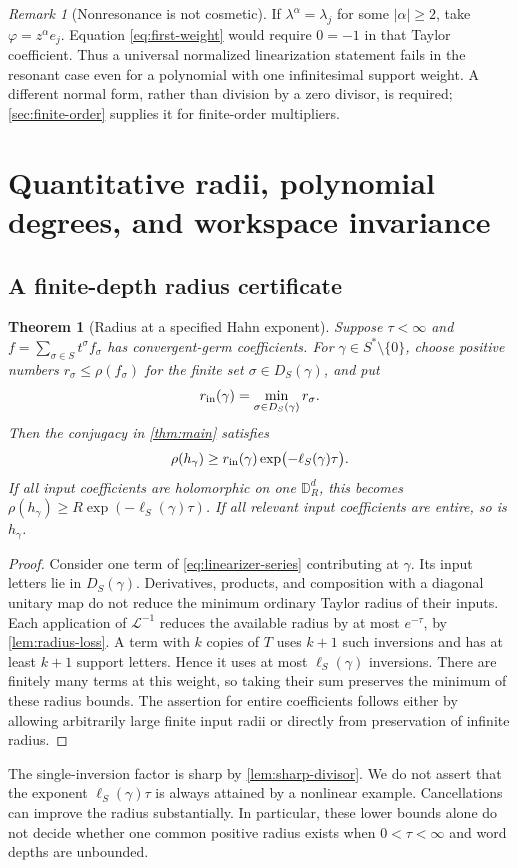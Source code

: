 \documentclass[11pt,letterpaper]{article}
\newtheorem{theorem}{Theorem}[section]
\theoremstyle{definition}
\theoremstyle{remark}
\newtheorem{remark}[remark]{Remark}
\newcommand{\DR}{\mathbb D_R^d}
\newcommand{\Li}{\mathcal L}
\numberwithin{equation}{section}
\begin{document}
\begin{remark}[Nonresonance is not cosmetic]
If $\lambda^\alpha=\lambda_j$ for some $|\alpha|\ge2$, take
$\varphi=z^\alpha e_j$. Equation \eqref{eq:first-weight} would require
$0=-1$ in that Taylor coefficient. Thus a universal normalized linearization
statement fails in the resonant case even for a polynomial with one
infinitesimal support weight. A different normal form, rather than division
by a zero divisor, is required; \cref{sec:finite-order} supplies it for
finite-order multipliers.
\end{remark}

\section{Quantitative radii, polynomial degrees, and workspace invariance}
\label{sec:quantitative}

\subsection{A finite-depth radius certificate}
\begin{theorem}[Radius at a specified Hahn exponent]\label{thm:radius-depth}
Suppose $\tau<\infty$ and $f=\sum_{\sigma\in S}t^\sigma f_\sigma$
has convergent-germ coefficients. For $\gamma\in S^*\setminus\{0\}$,
choose positive numbers $r_\sigma\le\rho(f_\sigma)$ for the finite set
$\sigma\in D_S(\gamma)$, and put
\[
 r_{\rm in}(\gamma)=\min_{\sigma\in D_S(\gamma)}r_\sigma.
\]
Then the conjugacy in \cref{thm:main} satisfies
\begin{equation}\label{eq:radius-depth}
 \rho(h_\gamma)\ge
       r_{\rm in}(\gamma)\exp\bigl(-\ell_S(\gamma)\tau\bigr).
\end{equation}
If all input coefficients are holomorphic on one $\DR$, this becomes
$\rho(h_\gamma)\ge R\exp(-\ell_S(\gamma)\tau)$.
If all relevant input coefficients are entire, so is $h_\gamma$.
\end{theorem}
\begin{proof}
Consider one term of \eqref{eq:linearizer-series} contributing at $\gamma$.
Its input letters lie in $D_S(\gamma)$. Derivatives, products, and composition
with a diagonal unitary map do not reduce the minimum ordinary Taylor
radius of their inputs. Each application of $\Li^{-1}$ reduces the
available radius by at most $e^{-\tau}$, by \cref{lem:radius-loss}.
A term with $k$ copies of $T$ uses $k+1$ such inversions and has at least
$k+1$ support letters. Hence it uses at most $\ell_S(\gamma)$ inversions.
There are finitely many terms at this weight, so taking their sum preserves
the minimum of these radius bounds. The assertion for entire coefficients
follows either by allowing arbitrarily large finite input radii or directly
from preservation of infinite radius.
\end{proof}
The single-inversion factor is sharp by \cref{lem:sharp-divisor}. We do
not assert that the exponent $\ell_S(\gamma)\tau$ is always attained by a
nonlinear example. Cancellations can improve the radius substantially.
In particular, these lower bounds alone do not decide whether one common
positive radius exists when $0<\tau<\infty$ and word depths are unbounded.
\end{document}
